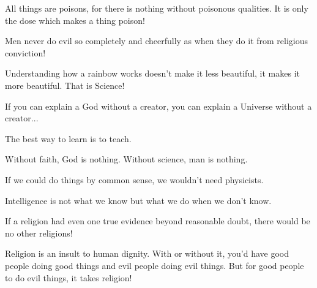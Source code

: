  	\begin{fuquote}[Paracelsus]All things are poisons, for there is nothing without poisonous qualities. It is only the dose which makes a thing poison!
 	\end{fuquote}
 	
 	\begin{fuquote}Men never do evil so completely and cheerfully as when they do it from religious conviction!
 	\end{fuquote}
 	
 	\begin{fuquote}Understanding how a rainbow works doesn't make it less beautiful, it makes it more beautiful. That is Science!
 	\end{fuquote}
 	
 	\begin{fuquote}[?]If you can explain a God without a creator, you can explain a Universe without a creator...
 	\end{fuquote}
 	
	\begin{fuquote}The best way to learn is to teach.
 	\end{fuquote}
 	
	\begin{fuquote}Without faith, God is nothing. Without science, man is nothing.
 	\end{fuquote}
 	
 	\begin{fuquote}If we could do things by common sense, we wouldn't need physicists.
 	\end{fuquote}
 	
 	\begin{fuquote}Intelligence is not what we know but what we do when we don't know.
 	\end{fuquote}
 	
 	\begin{fuquote}[?]If a religion had even one true evidence beyond reasonable doubt, there would be no other religions!
 	\end{fuquote}
 	
 	\begin{fuquote}Religion is an insult to human dignity. With or without it, you'd have good people doing good things and evil people doing evil things. But for good people to do evil things, it takes religion!
 	\end{fuquote}
 	
